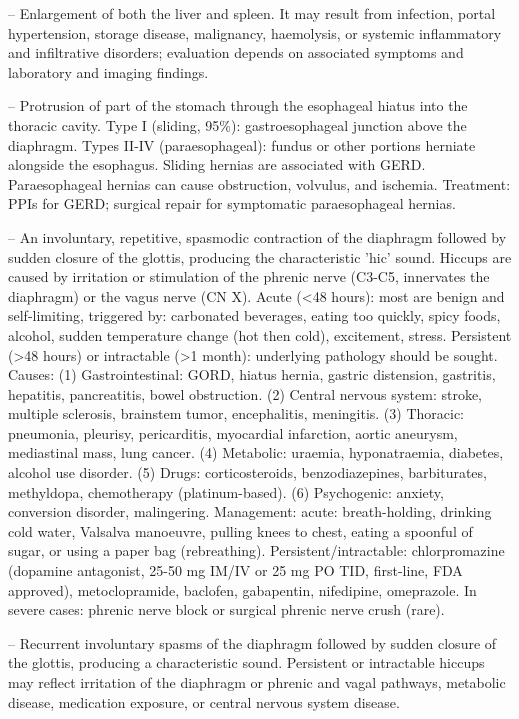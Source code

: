 -- Enlargement of both the liver and spleen. It may result from infection, portal hypertension, storage disease, malignancy, haemolysis, or systemic inflammatory and infiltrative disorders; evaluation depends on associated symptoms and laboratory and imaging findings.

-- Protrusion of part of the stomach through the esophageal hiatus into the thoracic cavity. Type I (sliding, 95\%): gastroesophageal junction above the diaphragm. Types II-IV (paraesophageal): fundus or other portions herniate alongside the esophagus. Sliding hernias are associated with GERD. Paraesophageal hernias can cause obstruction, volvulus, and ischemia. Treatment: PPIs for GERD; surgical repair for symptomatic paraesophageal hernias.

-- An involuntary, repetitive, spasmodic contraction of the diaphragm followed by sudden closure of the glottis, producing the characteristic 'hic' sound. Hiccups are caused by irritation or stimulation of the phrenic nerve (C3-C5, innervates the diaphragm) or the vagus nerve (CN X). Acute (<48 hours): most are benign and self-limiting, triggered by: carbonated beverages, eating too quickly, spicy foods, alcohol, sudden temperature change (hot then cold), excitement, stress. Persistent (>48 hours) or intractable (>1 month): underlying pathology should be sought. Causes: (1) Gastrointestinal: GORD, hiatus hernia, gastric distension, gastritis, hepatitis, pancreatitis, bowel obstruction. (2) Central nervous system: stroke, multiple sclerosis, brainstem tumor, encephalitis, meningitis. (3) Thoracic: pneumonia, pleurisy, pericarditis, myocardial infarction, aortic aneurysm, mediastinal mass, lung cancer. (4) Metabolic: uraemia, hyponatraemia, diabetes, alcohol use disorder. (5) Drugs: corticosteroids, benzodiazepines, barbiturates, methyldopa, chemotherapy (platinum-based). (6) Psychogenic: anxiety, conversion disorder, malingering. Management: acute: breath-holding, drinking cold water, Valsalva manoeuvre, pulling knees to chest, eating a spoonful of sugar, or using a paper bag (rebreathing). Persistent/intractable: chlorpromazine (dopamine antagonist, 25-50 mg IM/IV or 25 mg PO TID, first-line, FDA approved), metoclopramide, baclofen, gabapentin, nifedipine, omeprazole. In severe cases: phrenic nerve block or surgical phrenic nerve crush (rare).

-- Recurrent involuntary spasms of the diaphragm followed by sudden closure of the glottis, producing a characteristic sound. Persistent or intractable hiccups may reflect irritation of the diaphragm or phrenic and vagal pathways, metabolic disease, medication exposure, or central nervous system disease.

